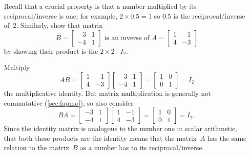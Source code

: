 \begin{example} \label{eg:a2x2inv}
Recall that a crucial property is that a number multiplied by its reciprocal\slash inverse is one: for example, \(2\times 0.5=1\) so \(0.5\) is the reciprocal\slash inverse of~\(2\).
Similarly, show that matrix 
\begin{equation*}
B=\begin{bmatrix} -3&1\\-4&1 \end{bmatrix}
\text{ is an inverse of }
A=\begin{bmatrix} 1&-1\\4&-3 \end{bmatrix}
\end{equation*}
by showing their product is the \(2\times2\) ~\(I_2\).
\begin{solution} 
Multiply 
\begin{equation*}
AB=\begin{bmatrix} 1&-1\\4&-3 \end{bmatrix}
\begin{bmatrix} -3&1\\-4&1 \end{bmatrix}
=\begin{bmatrix} 1&0\\0&1 \end{bmatrix}=I_2
\end{equation*}
the multiplicative identity.  
But matrix multiplication is generally not commutative (\cref{sec:fapmo}), so also consider
\begin{equation*}
BA=\begin{bmatrix} -3&1\\-4&1 \end{bmatrix}
\begin{bmatrix} 1&-1\\4&-3 \end{bmatrix}
=\begin{bmatrix} 1&0\\0&1 \end{bmatrix}=I_2\,.
\end{equation*}
Since the identity matrix is analogous to the number one in scalar arithmetic, that both these products are the identity means that the matrix~\(A\) has the same relation to the matrix~\(B\) as a number has to its reciprocal\slash inverse.
\marginpar{}%


\end{solution}
\end{example}
